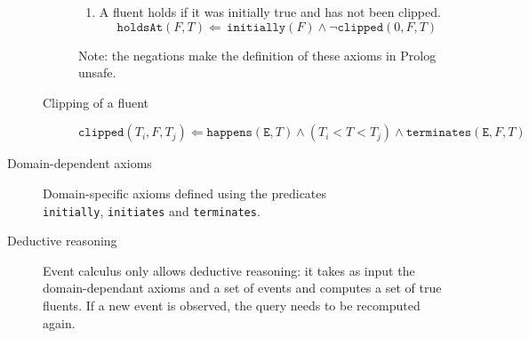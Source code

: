\begin{description}
\begin{description}
\begin{enumerate}
                    \item A fluent holds if it was initially true and has not been clipped.
                        \[ \texttt{holdsAt}(F, T) \Leftarrow\, \texttt{initially}(F) \land \lnot\texttt{clipped}(0, F, T) \]
                \end{enumerate}
                Note: the negations make the definition of these axioms in Prolog unsafe.
            
            \item[Clipping of a fluent]
                \[ \texttt{clipped}(T_i, F, T_j) \Leftarrow \texttt{happens}(\texttt{E}, T) \land (T_i < T < T_j) \land \texttt{terminates}(\texttt{E}, F, T) \]
        \end{description}

    \item[Domain-dependent axioms] 
        Domain-specific axioms defined using the predicates\\\texttt{initially}, \texttt{initiates} and \texttt{terminates}.
\end{description}

\begin{description}
    \item[Deductive reasoning] 
        Event calculus only allows deductive reasoning: 
        it takes as input the domain-dependant axioms and a set of events and computes a set of true fluents.
        If a new event is observed, the query needs to be recomputed again.
\end{description}


